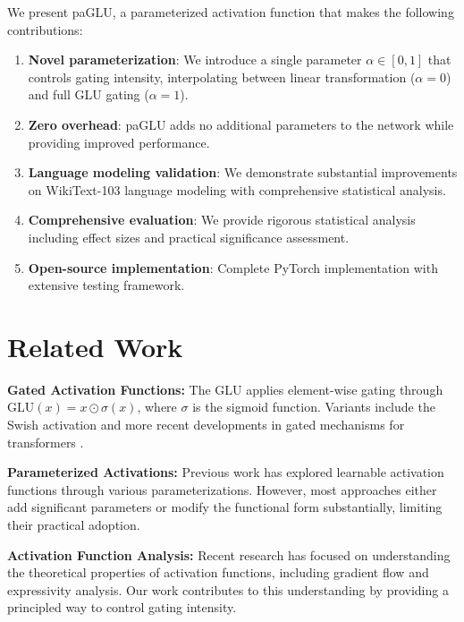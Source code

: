 \documentclass[11pt]{article}
\begin{document}
We present paGLU, a parameterized activation function that makes the following contributions:

\begin{enumerate}
    \item \textbf{Novel parameterization}: We introduce a single parameter $\alpha \in [0,1]$ that controls gating intensity, interpolating between linear transformation ($\alpha=0$) and full GLU gating ($\alpha=1$).
    
    \item \textbf{Zero overhead}: paGLU adds no additional parameters to the network while providing improved performance.
    
    \item \textbf{Language modeling validation}: We demonstrate substantial improvements on WikiText-103 language modeling with comprehensive statistical analysis.
    
    \item \textbf{Comprehensive evaluation}: We provide rigorous statistical analysis including effect sizes and practical significance assessment.
    
    \item \textbf{Open-source implementation}: Complete PyTorch implementation with extensive testing framework.
\end{enumerate}

\section{Related Work}
\label{sec:related}

\textbf{Gated Activation Functions:} The GLU \citep{dauphin2017language} applies element-wise gating through $\text{GLU}(x) = x \odot \sigma(x)$, where $\sigma$ is the sigmoid function. Variants include the Swish activation \citep{ramachandran2017searching} and more recent developments in gated mechanisms for transformers \citep{vaswani2017attention}.

\textbf{Parameterized Activations:} Previous work has explored learnable activation functions through various parameterizations. However, most approaches either add significant parameters or modify the functional form substantially, limiting their practical adoption.

\textbf{Activation Function Analysis:} Recent research has focused on understanding the theoretical properties of activation functions, including gradient flow \citep{he2015delving} and expressivity analysis. Our work contributes to this understanding by providing a principled way to control gating intensity.
\end{document}
